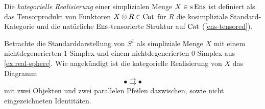 \begin{defn}
  Die \emph{kategorielle Realisierung} einer simplizialen Menge $X \in
  \operatorname{s}\operatorname{Ens}$ ist definiert als das Tensorprodukt von Funktoren $X \otimes
  R \in \operatorname{Cat}$ für $R$ die kosimpliziale Standard-Kategorie und die
  natürliche $\operatorname{Ens}$-tensorierte Struktur auf $\operatorname{Cat}$
  (\ref{ens-tensored}).
\end{defn}
\begin{bsp} \label{ex:s1-diagram}
  Betrachte die Standarddarstellung von $S^1$ als simpliziale Menge
  $X$ mit einem nichtdegenerierten $1$-Simplex und einem
  nichtdegenerierten $0$-Simplex aus \ref{ex:real-sphere}. Wie
  angekündigt ist die kategorielle Realisierung von $X$ das Diagramm
  \[ \bullet \rightrightarrows \bullet \]
  mit zwei Objekten und zwei parallelen Pfeilen dazwischen, sowie
  nicht eingezeichneten Identitäten.
\end{bsp}

